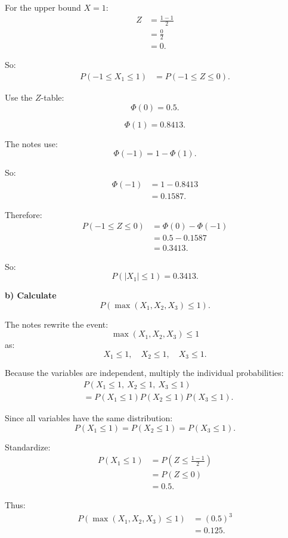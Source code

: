 \documentclass[10pt]{article}
\begin{document}
For the upper bound \(X=1\):
\begin{align*}
Z
&=
\frac{1-1}{2}
\\[2mm]
&=
\frac{0}{2}
\\[2mm]
&=0.
\end{align*}

So:
\begin{align*}
P(-1\le X_1\le 1)
&=
P(-1\le Z\le 0).
\end{align*}

Use the \(Z\)-table:
\[
\Phi(0)=0.5.
\]

\[
\Phi(1)=0.8413.
\]

The notes use:
\[
\Phi(-1)=1-\Phi(1).
\]

So:
\begin{align*}
\Phi(-1)
&=
1-0.8413
\\[2mm]
&=
0.1587.
\end{align*}

Therefore:
\begin{align*}
P(-1\le Z\le 0)
&=
\Phi(0)-\Phi(-1)
\\[2mm]
&=
0.5-0.1587
\\[2mm]
&=
0.3413.
\end{align*}

So:
\[
P(|X_1|\le 1)=0.3413.
\]

\textbf{b) Calculate}
\[
P(\max(X_1,X_2,X_3)\le 1).
\]

The notes rewrite the event:
\[
\max(X_1,X_2,X_3)\le 1
\]
as:
\[
X_1\le 1,\quad X_2\le 1,\quad X_3\le 1.
\]

Because the variables are independent, multiply the
individual probabilities:
\begin{align*}
&P(X_1\le 1,\ X_2\le 1,\ X_3\le 1)
\\[2mm]
&=
P(X_1\le 1)
P(X_2\le 1)
P(X_3\le 1).
\end{align*}

Since all variables have the same distribution:
\[
P(X_1\le 1)
=
P(X_2\le 1)
=
P(X_3\le 1).
\]

Standardize:
\begin{align*}
P(X_1\le 1)
&=
P\left(
Z\le
\frac{1-1}{2}
\right)
\\[2mm]
&=
P(Z\le 0)
\\[2mm]
&=
0.5.
\end{align*}

Thus:
\begin{align*}
P(\max(X_1,X_2,X_3)\le 1)
&=
(0.5)^3
\\[2mm]
&=
0.125.
\end{align*}
\end{document}
